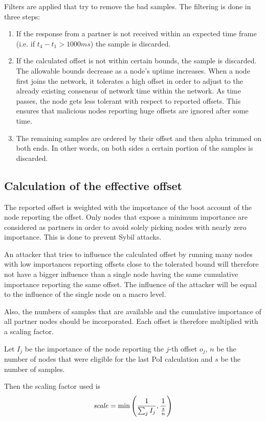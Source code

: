 Filters are applied that try to remove the bad samples. The filtering is done in three steps:
\begin{enumerate}
\item If the response from a partner is not received within an expected time frame (i.e. if $t_4-t_1 > 1000ms$) the sample is discarded.
\item If the calculated offset is not within certain bounds, the sample is discarded.
The allowable bounds decrease as a node's uptime increases.
When a node first joins the network, it tolerates a high offset in order to adjust to the already existing consensus of network time within the network.
As time passes, the node gets less tolerant with respect to reported offsets.
This ensures that malicious nodes reporting huge offsets are ignored after some time.
\item The remaining samples are ordered by their offset and then alpha trimmed on both ends.
In other words, on both sides a certain portion of the samples is discarded.
\end{enumerate}

\subsection{Calculation of the effective offset}

The reported offset is weighted with the importance of the boot account of the node reporting the offset.
Only nodes that expose a minimum importance are considered as partners in order to avoid solely picking nodes with nearly zero importance.
This is done to prevent Sybil attacks.

An attacker that tries to influence the calculated offset by running many nodes with low importances reporting offsets close to the tolerated bound will therefore not have a bigger influence than a single node having the same cumulative importance reporting the same offset.
The influence of the attacker will be equal to the influence of the single node on a macro level.

Also, the numbers of samples that are available and the cumulative importance of all partner nodes should be incorporated.
Each offset is therefore multiplied with a scaling factor.

Let $I_j$ be the importance of the node reporting the $j$-th offset $o_j$,
$n$ be the number of nodes that were eligible for the last PoI calculation and $s$ be the number of samples.

Then the scaling factor used is
$$ \mathit{scale} = \min\left(\frac{1}{\sum_j I_j}, \frac{1}{\frac{s}{n}}\right)$$

